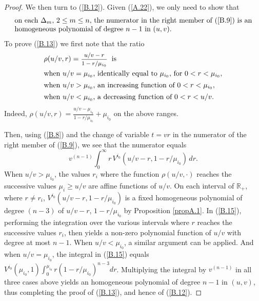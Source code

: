 \documentclass[12pt,leqno]{article}
\def\IR{{\mathbb R}}
\def\dis{\displaystyle}
\def\f{\footnotesize}
\begin{document}
\begin{appendix}
\begin{proof}
\medskip
We then turn to (\ref{B.12}). Given (\ref{A.22}), we only need to show that
\begin{equation}\label{B.13}
\begin{array}{l}
\mbox{on each $\Delta_m$, $2 \le m \le n$, the numerator in the right member of (\ref{B.9}) is an}
\\
\mbox{homogeneous polynomial of degree $n-1$ in $(u,v)$}.
\end{array}
\end{equation}
To prove (\ref{B.13}) we first note that the ratio
\begin{equation}\label{B.14}
\begin{array}{lll}
\rho(u/v, r) = \mbox{\f $\dis\frac{u/v - r}{1 - r/\mu_{i_0}}$} \; \; \mbox{is} 
\\[2ex]
\mbox{when $u/v = \mu_{i_0}$, identically equal to $\mu_{i_0}$, for $0 < r < \mu_{i_0}$},
\\[1ex]
\mbox{when $u/v > \mu_{i_0}$, an increasing function of $0 < r < \mu_{i_0}$},
\\[1ex]
\mbox{when $u/v < \mu_{i_0}$, a decreasing function of $0 < r < u/v$}.
\end{array}
\end{equation}
Indeed, $\rho(u/v,r) = \frac{u/v - \mu_{i_0}}{1 - r/\mu_{i_0}} + \mu_{i_0}$ on the above ranges.

\medskip
Then, using (\ref{B.8}) and the change of variable $t = vr$ in the numerator of the right member of (\ref{B.9}), we see that the numerator equals
\begin{equation}\label{B.15}
v^{(n-1)} \dis\int^\infty_0 r \, V^{i_0} (u/v - r, 1 - r/\mu_{i_0}) \, dr.
\end{equation}
When $u/v > \mu_{i_0}$, the values $r_i$ where the function $\rho(u/v, \cdot)$ reaches the successive values $\mu_i \ge u/v$ are affine functions of $u/v$. On each interval of $\IR_+$, where $r \not= r_i$, $V^{i_0} (u/v-r, 1 - r/\mu_{i_0})$ is a fixed homogeneous polynomial of degree $(n-3)$ of $u/v-r$, $1 - r/\mu_{i_0}$ by Proposition \ref{propA.1}. In (\ref{B.15}), performing the integration over the various intervals where $r$ reaches the successive values $r_i$, then yields a non-zero polynomial function of $u/v$ with degree at most $n-1$. When $u/v < \mu_{i_0}$, a similar argument can be applied. And when $u/v = \mu_{i_0}$, the integral in (\ref{B.15}) equals $V^{i_0} (\mu_{i_0},1) \int^{\mu_{i_0}}_0 r(1-r/\mu_{i_0})^{n-3} dr$. Multiplying the integral by $v^{(n-1)}$ in all three cases above yields an homogeneous polynomial of degree $n-1$ in $(u,v)$, thus completing the proof of (\ref{B.13}), and hence of (\ref{B.12}).
\end{proof}


\end{appendix}
\end{document}
